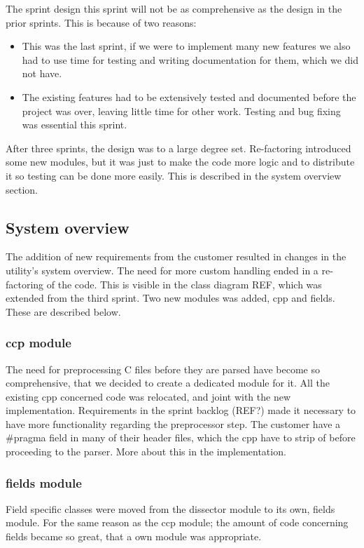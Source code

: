 The sprint design this sprint will not be as comprehensive as the design in the prior sprints. This is because of two reasons:
\begin{itemize}
	\item This was the last sprint, if we were to implement many new features we also had to use time for testing and writing documentation for them, which we did not have.
	\item The existing features had to be extensively tested and documented before the project was over, leaving little time for other work. Testing and bug fixing was essential this sprint.
\end{itemize}
After three sprints, the design was to a large degree set. Re-factoring introduced some new modules, but it was just to make the code more logic and to distribute it so testing can be done more easily. This is described in the system overview section.

\subsection{System overview}
The addition of new requirements from the customer resulted in changes in the utility's system overview. The need for more custom handling ended in a re-factoring of the code. This is visible in the class diagram REF, which was extended from the third sprint. Two new modules was added, cpp and fields. These are described below. 
\subsubsection{ccp module}
The need for preprocessing C files before they are parsed have become so comprehensive, that we decided to create a dedicated module for it. All the existing cpp concerned code was relocated, and joint with the new implementation. Requirements in the sprint backlog (REF?) made it necessary to have more functionality regarding the preprocessor step. The customer have a \#pragma field in many of their header files, which the cpp have to strip of before proceeding to the parser. More about this in the implementation.

\subsubsection{fields module}
Field specific classes were moved from the dissector module to its own, fields module. For the same reason as the ccp module; the amount of code concerning fields became so great, that a own module was appropriate. 

